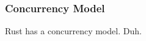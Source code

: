 

\subsubsection{Concurrency Model} %
\label{ssub:concurrency_model}

Rust has a concurrency model. Duh.




